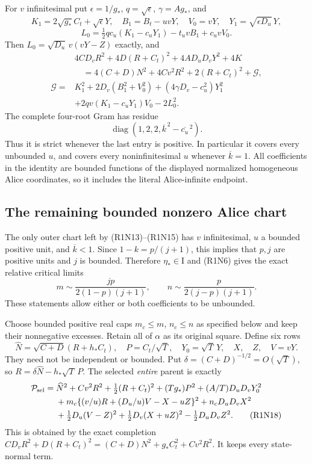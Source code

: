 For $v$ infinitesimal put $\epsilon=1/g_*$, $q=\sqrt\epsilon$,
$\gamma=Ag_*$, and
\[
 K_1=2\sqrt{g_*}C_t+\sqrt\epsilon Y,\quad
 B_1=B_t-uvY,\quad V_0=vY,\quad Y_1=\sqrt{\epsilon D_u}\,Y,
\]
\[
 L_0=\tfrac12qc_u(K_1-c_uY_1)-t_uvB_1+c_uvV_0.
\]
Then $L_0=\sqrt{D_u}\,v(vY-Z)$ exactly, and
\begin{align*}
 &4CD_vR^2+4D(R+C_t)^2+4AD_uD_vY^2+4K\\
 &\quad=4(C+D)N^2+4Cv^2R^2+2(R+C_t)^2+\mathcal G,\\
 \mathcal G={}&K_1^2+2D_v(B_1^2+V_0^2)
 +(4\gamma D_v-c_u^2)Y_1^2\\
 &+2qv(K_1-c_uY_1)V_0-2L_0^2 .
\tag{R1N14}
\end{align*}
The complete four-root Gram has residue
\[
 \operatorname{diag}(1,2,2,\overline{k}^{\,2}
                                      -\overline{c_u}^{\,2}).    \tag{R1N15}
\]
Thus it is strict whenever the last entry is positive.  In particular
it covers every unbounded $u$, and covers every noninfinitesimal
$u$ whenever $\overline k=1$.  All coefficients in the identity
are bounded functions of the displayed normalized homogeneous Alice
coordinates, so it includes the literal Alice-infinite endpoint.

\subsection{The remaining bounded nonzero Alice chart}

The only outer chart left by (R1N13)--(R1N15) has $v$ infinitesimal,
$u$ a bounded positive unit, and $\overline k<1$.  Since
$1-k=p/(j+1)$, this implies that $p,j$ are positive units and $j$
is bounded.  Therefore $\eta_*\in\mathrm I$ and (R1N6) gives the
exact relative critical limits
\[
 m\sim\frac{jp}{2(1-p)(j+1)},\qquad
 n\sim\frac{p}{2(j-p)(j+1)}.                              \tag{R1N16}
\]
These statements allow either or both coefficients to be unbounded.

Choose bounded positive real caps $m_c\le m$, $n_c\le n$ as specified
below and keep their nonnegative excesses.  Retain all of $\alpha$
as its original square.  Define six rows
\[
 \widehat N=\sqrt{C+D}(R+h_*C_t),\quad
 P=C_t/\sqrt T,\quad Y_0=\sqrt T\,Y,\quad
 X,\quad Z,\quad V=vY.                                  \tag{R1N17}
\]
They need not be independent or bounded.  Put
$\delta=(C+D)^{-1/2}=O(\sqrt T)$, so
$R=\delta\widehat N-h_*\sqrt T\,P$.
The selected \emph{entire} parent is exactly
\begin{align*}
 \mathcal P_{\rm sel}={}&
 \widehat N^2+Cv^2R^2+\tfrac12(R+C_t)^2
       +(Tg_*)P^2+(A/T)D_uD_vY_0^2\\
 &+m_c\{(v/u)R+(D_u/u)V-X-uZ\}^2+n_cD_uD_vX^2\\
 &+\tfrac12D_u(V-Z)^2+\tfrac12D_v(X+uZ)^2
                                      -\tfrac12D_uD_vZ^2 .
\tag{R1N18}
\end{align*}
This is obtained by the exact completion
$CD_vR^2+D(R+C_t)^2=(C+D)N^2+g_*C_t^2+Cv^2R^2$.
It keeps every state-normal term.

